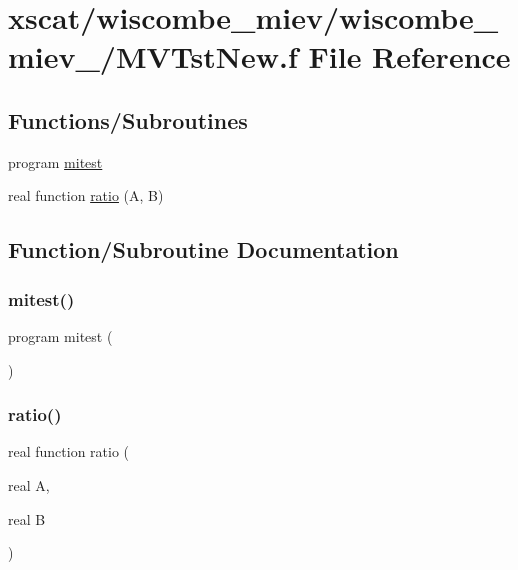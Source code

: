 \hypertarget{wiscombe__miev__1_2_m_v_tst_new_8f}{}\section{xscat/wiscombe\+\_\+miev/wiscombe\+\_\+miev\+\_/\+M\+V\+Tst\+New.f File Reference}
\label{wiscombe__miev__1_2_m_v_tst_new_8f}
\subsection*{Functions/\+Subroutines}
\begin{DoxyCompactItemize}
\item 
program \hyperlink{wiscombe__miev__1_2_m_v_tst_new_8f_a636adb658dfc9c3b74cc98be77994b4a}{mitest}
\item 
real function \hyperlink{wiscombe__miev__1_2_m_v_tst_new_8f_a396222f13423ee47fd1da44298d0e366}{ratio} (A, B)
\end{DoxyCompactItemize}


\subsection{Function/\+Subroutine Documentation}
\mbox{\label{wiscombe__miev__1_2_m_v_tst_new_8f_a636adb658dfc9c3b74cc98be77994b4a}} 
\subsubsection{\texorpdfstring{mitest()}{mitest()}}
{\footnotesize\ttfamily program mitest (\begin{DoxyParamCaption}{ }\end{DoxyParamCaption})}

\mbox{\label{wiscombe__miev__1_2_m_v_tst_new_8f_a396222f13423ee47fd1da44298d0e366}} 
\subsubsection{\texorpdfstring{ratio()}{ratio()}}
{\footnotesize\ttfamily real function ratio (\begin{DoxyParamCaption}\item[{real}]{A,  }\item[{real}]{B }\end{DoxyParamCaption})}

